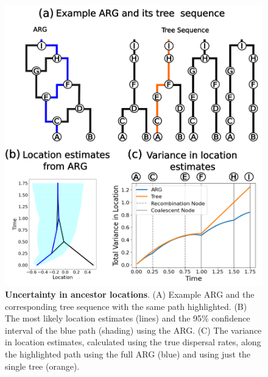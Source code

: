 \begin{figure}[hbtp]
    \centering
    \includegraphics[width=\linewidth]{Images/Figure3_TrackLineage/Fig3_TrackSingleLineage.png}
    \caption{ \textbf{Uncertainty in ancestor locations}. (A) Example ARG and the corresponding tree sequence with the same path highlighted. (B) The most likely location estimates (lines) and the 95\% confidence interval of the blue path (shading) using the ARG. (C) The variance in location estimates, calculated using the true dispersal rates, along the highlighted path  using the full ARG (blue) and using just the single tree (orange).}
    \label{fig:SingleLineage}
\end{figure}





